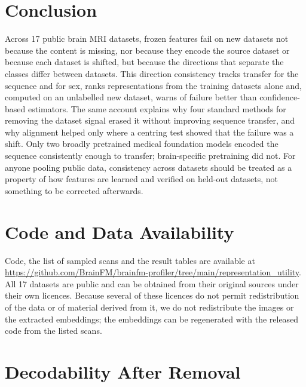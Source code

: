 \documentclass[11pt]{article}
\begin{document}
\section{Conclusion}

Across 17 public brain MRI datasets, frozen features fail on new datasets
not because the content is missing, nor because they encode the source
dataset or because each dataset is shifted, but because the directions that
separate the classes differ between datasets. This direction consistency
tracks transfer for the sequence and for sex, ranks representations from the training datasets alone
and, computed on an unlabelled new dataset, warns of failure better than
confidence-based estimators. The same account explains why four standard
methods for removing the dataset signal erased it without improving sequence
transfer, and why alignment helped only where a centring test showed that the
failure was a shift. Only two broadly pretrained medical foundation models
encoded the sequence consistently enough to transfer; brain-specific
pretraining did not. For anyone pooling public data, consistency across
datasets should be treated as a property of how features are learned and
verified on held-out datasets, not something to be corrected afterwards.


\section*{Code and Data Availability}

Code, the list of sampled scans and the result tables are available at
\url{https://github.com/BrainFM/brainfm-profiler/tree/main/representation_utility}. All 17 datasets are public
and can be obtained from their original sources under their own licences.
Because several of these licences do not permit redistribution of the data
or of material derived from it, we do not redistribute the images or the
extracted embeddings; the embeddings can be regenerated with the released
code from the listed scans.




\appendix

\section{Decodability After Removal}
\end{document}
